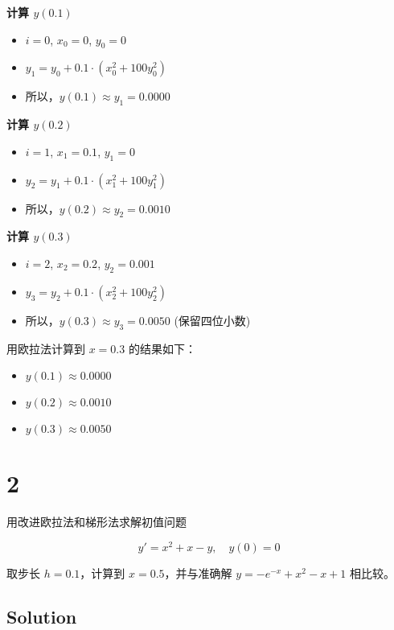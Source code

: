 \documentclass[11pt]{article}
\providecommand{\tightlist}{%
      \setlength{\itemsep}{0pt}\setlength{\parskip}{0pt}}
\begin{document}
\textbf{计算 \(y(0.1)\)}

\begin{itemize}
\tightlist
\item
  \(i=0\), \(x_0 = 0\), \(y_0 = 0\)
\item
  \(y_1 = y_0 + 0.1 \cdot (x_0^2 + 100y_0^2)\)
\item
  所以，\(y(0.1) \approx y_1 = 0.0000\)
\end{itemize}

\textbf{计算 \(y(0.2)\)}

\begin{itemize}
\tightlist
\item
  \(i=1\), \(x_1 = 0.1\), \(y_1 = 0\)
\item
  \(y_2 = y_1 + 0.1 \cdot (x_1^2 + 100y_1^2)\)
\item
  所以，\(y(0.2) \approx y_2 = 0.0010\)
\end{itemize}

\textbf{计算 \(y(0.3)\)}

\begin{itemize}
\tightlist
\item
  \(i=2\), \(x_2 = 0.2\), \(y_2 = 0.001\)
\item
  \(y_3 = y_2 + 0.1 \cdot (x_2^2 + 100y_2^2)\)
\item
  所以，\(y(0.3) \approx y_3 = 0.0050\) (保留四位小数)
\end{itemize}

用欧拉法计算到 \(x=0.3\) 的结果如下：

\begin{itemize}
\tightlist
\item
  \(y(0.1) \approx 0.0000\)
\item
  \(y(0.2) \approx 0.0010\)
\item
  \(y(0.3) \approx 0.0050\)
\end{itemize}

    \section{2}\label{section}

用改进欧拉法和梯形法求解初值问题

\[
y' = x^2 + x - y,\quad y(0) = 0
\]

取步长 \(h = 0.1\)，计算到 \(x = 0.5\)，并与准确解
\(y = -e^{-x} + x^2 - x + 1\) 相比较。

\subsection{Solution}\label{solution}
\end{document}
